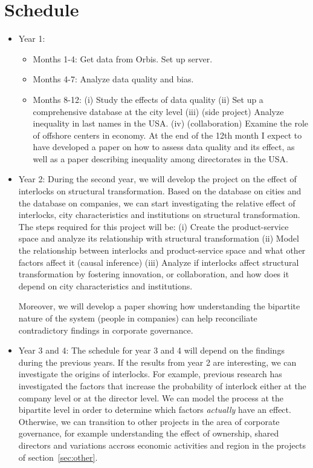 \section{Schedule}
\label{sec:schedule}
\begin{itemize}[leftmargin=*]
\item Year 1: 
\begin{itemize}[leftmargin=*]
\item Months 1-4: Get data from Orbis. Set up server.
\item Months 4-7: Analyze data quality and bias.
\item Months 8-12: (i) Study the effects of data quality (ii) Set up a comprehensive database at the city level (iii) (side project) Analyze inequality in last names in the USA. (iv) (collaboration) Examine the role of offshore centers in economy. 
At the end of the 12th month I expect to have developed a paper on how to assess data quality and its effect, as well as a paper describing inequality among directorates in the USA.
\end{itemize}
\item Year 2:  
During the second year, we will develop the project on the effect of interlocks on structural transformation. 
Based on the database on cities and the database on companies, 
we can start investigating the relative effect of interlocks, city characteristics and institutions on structural transformation.
The steps required for this project will be: (i) Create the product-service space and analyze its relationship with structural transformation (ii) Model the relationship between interlocks and product-service space and what other factors affect it (causal inference) (iii) Analyze if interlocks affect structural transformation by fostering innovation, or collaboration, and how does it depend on city characteristics and institutions.

Moreover, 
we will develop a paper showing how understanding the bipartite nature of the system (people in companies) can help reconciliate contradictory findings in corporate governance.
\medskip
\item Year 3 and 4:
The schedule for year 3 and 4 will depend on the findings during the previous years. 
If the results from year 2 are interesting,
we can investigate the origins of interlocks.
For example, previous research has investigated the factors that increase the probability of interlock either at the company level or at the director level.
We can model the process at the bipartite level in order to determine which factors \textit{actually} have an effect.
Otherwise, we can transition to other projects in the area of corporate governance,
for example understanding the effect of ownership, shared directors and variations accross economic activities and region in the projects of section~\ref{sec:other}.
\end{itemize}
